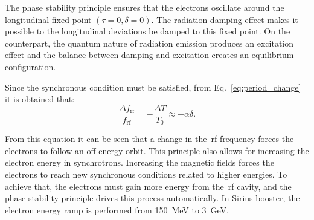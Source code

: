 The phase stability principle ensures that the electrons oscillate around the longitudinal fixed point $(\tau = 0, \delta = 0)$. The radiation damping effect makes it possible to the longitudinal deviations be damped to this fixed point. On the counterpart, the quantum nature of radiation emission produces an excitation effect and the balance between damping and excitation creates an equilibrium configuration.

Since the synchronous condition must be satisfied, from Eq.~\eqref{eq:period_change} it is obtained that:
\begin{equation}
    \dfrac{\Delta f_{\mathrm{rf}}}{f_{\mathrm{rf}}} = -\dfrac{\Delta T}{T_0} \approx -\alpha \delta.
    \label{eq:delta_freq}
\end{equation}

From this equation it can be seen that a change in the~\gls{rf} frequency forces the electrons to follow an off-energy orbit. This principle also allows for increasing the electron energy in synchrotrons. Increasing the magnetic fields forces the electrons to reach new synchronous conditions related to higher energies. To achieve that, the electrons must gain more energy from the~\gls{rf} cavity, and the phase stability principle drives this process automatically. In Sirius booster, the electron energy ramp is performed from \SI{150}{\mega \electronvolt} to \SI{3}{\giga \electronvolt}.



